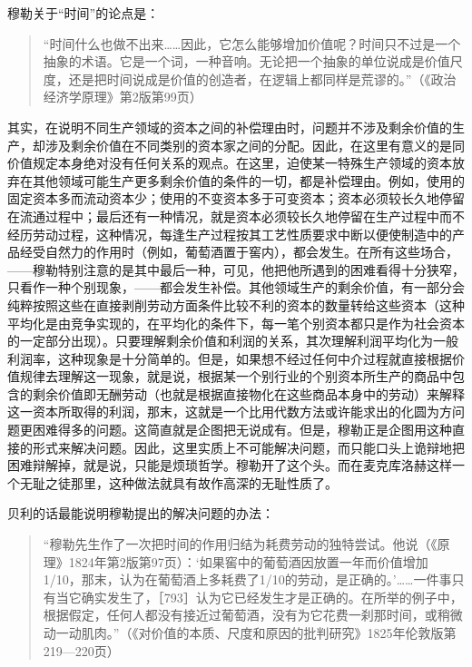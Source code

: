 穆勒关于“时间”的论点是：

\begin{quote}{“时间什么也做不出来……因此，它怎么能够增加价值呢？时间只不过是一个抽象的术语。它是一个词，一种音响。无论把一个抽象的单位说成是价值尺度，还是把时间说成是价值的创造者，在逻辑上都同样是荒谬的。”（《政治经济学原理》第2版第99页）}\end{quote}

其实，在说明不同生产领域的资本之间的补偿理由时，问题并不涉及剩余价值的生产，却涉及剩余价值在不同类别的资本家之间的分配。因此，在这里有意义的是同价值规定本身绝对没有任何关系的观点。在这里，迫使某一特殊生产领域的资本放弃在其他领域可能生产更多剩余价值的条件的一切，都是补偿理由。例如，使用的固定资本多而流动资本少；使用的不变资本多于可变资本；资本必须较长久地停留在流通过程中；最后还有一种情况，就是资本必须较长久地停留在生产过程中而不经历劳动过程，这种情况，每逢生产过程按其工艺性质要求中断以便使制造中的产品经受自然力的作用时（例如，葡萄酒置于窖内），都会发生。在所有这些场合，——穆勒特别注意的是其中最后一种，可见，他把他所遇到的困难看得十分狭窄，只看作一种个别现象，——都会发生补偿。其他领域生产的剩余价值，有一部分会纯粹按照这些在直接剥削劳动方面条件比较不利的资本的数量转给这些资本（这种平均化是由竞争实现的，在平均化的条件下，每一笔个别资本都只是作为社会资本的一定部分出现）。只要理解剩余价值和利润的关系，其次理解利润平均化为一般利润率，这种现象是十分简单的。但是，如果想不经过任何中介过程就直接根据价值规律去理解这一现象，就是说，根据某一个别行业的个别资本所生产的商品中包含的剩余价值即无酬劳动（也就是根据直接物化在这些商品本身中的劳动）来解释这一资本所取得的利润，那末，这就是一个比用代数方法或许能求出的化圆为方问题更困难得多的问题。这简直就是企图把无说成有。但是，穆勒正是企图用这种直接的形式来解决问题。因此，这里实质上不可能解决问题，而只能口头上诡辩地把困难辩解掉，就是说，只能是烦琐哲学。穆勒开了这个头。而在麦克库洛赫这样一个无耻之徒那里，这种做法就具有故作高深的无耻性质了。

贝利的话最能说明穆勒提出的解决问题的办法：

\begin{quote}{“穆勒先生作了一次把时间的作用归结为耗费劳动的独特尝试。他说（《原理》1824年第2版第97页）：‘如果窖中的葡萄酒因放置一年而价值增加1/10，那末，认为在葡萄酒上多耗费了1/10的劳动，是正确的。’……一件事只有当它确实发生了，［793］认为它已经发生才是正确的。在所举的例子中，根据假定，任何人都没有接近过葡萄酒，没有为它花费一刹那时间，或稍微动一动肌肉。”（《对价值的本质、尺度和原因的批判研究》1825年伦敦版第219—220页）}\end{quote}

